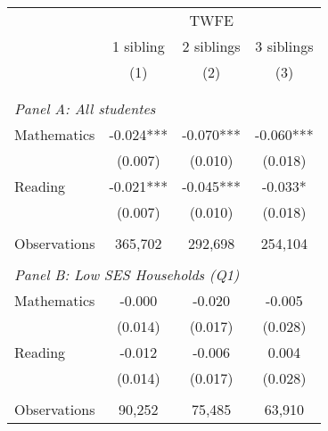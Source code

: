 \makeatletter
{}
{
\makeatother
\begin{tabular}{lccc}
\toprule
\cmidrule(lr){2-4}
& \multicolumn{3}{c}{TWFE} \\
\cmidrule(lr){2-4}
& 1 sibling & 2 siblings & 3 siblings  \\
\cmidrule(lr){2-2} \cmidrule(lr){3-3} \cmidrule(lr){4-4}
& (1) & (2) & (3)\\
\bottomrule
&  &  &  \\
&  &  &   \\
\multicolumn{4}{l}{\textit{Panel A: All studentes}} \\
\hspace{3mm}Mathematics&      -0.024***&      -0.070***&      -0.060***\\
                    &     (0.007)   &     (0.010)   &     (0.018)   \\
 
\hspace{3mm}Reading &      -0.021***&      -0.045***&      -0.033*  \\
                    &     (0.007)   &     (0.010)   &     (0.018)   \\
                    &               &               &               \\
\hspace{3mm}Observations&     365,702   &     292,698   &     254,104   \\
 
&  &  &   \\
\multicolumn{4}{l}{\textit{Panel B: Low SES Households (Q1)}} \\
\hspace{3mm}Mathematics&      -0.000   &      -0.020   &      -0.005   \\
                    &     (0.014)   &     (0.017)   &     (0.028)   \\
 
\hspace{3mm}Reading &      -0.012   &      -0.006   &       0.004   \\
                    &     (0.014)   &     (0.017)   &     (0.028)   \\
                    &               &               &               \\
\hspace{3mm}Observations&      90,252   &      75,485   &      63,910   \\
 

\end{tabular}}
